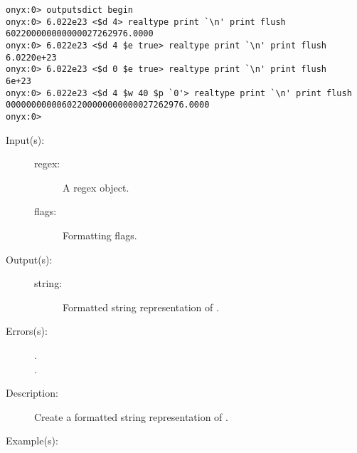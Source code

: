 \begin{description}
\begin{description}
\begin{verbatim}
onyx:0> outputsdict begin
onyx:0> 6.022e23 <$d 4> realtype print `\n' print flush
602200000000000027262976.0000
onyx:0> 6.022e23 <$d 4 $e true> realtype print `\n' print flush
6.0220e+23
onyx:0> 6.022e23 <$d 0 $e true> realtype print `\n' print flush
6e+23
onyx:0> 6.022e23 <$d 4 $w 40 $p `0'> realtype print `\n' print flush
00000000000602200000000000027262976.0000
onyx:0>
		\end{verbatim}
	\end{description}
\label{outputsdict:regextype}
\item[{\onyxop{regex flags}{regextype}{string}}: ]
	\begin{description}\item[]
	\item[Input(s): ]
		\begin{description}\item[]
		\item[regex: ]
			A regex object.
		\item[flags: ]
			Formatting flags.
		\end{description}
	\item[Output(s): ]
		\begin{description}\item[]
		\item[string: ]
			Formatted string representation of .
		\end{description}
	\item[Errors(s): ]
		\begin{description}\item[]
		\item[.]
		\item[.]
		\end{description}
	\item[Description: ]
		Create a formatted string representation of .
	\item[Example(s): ]\begin{verbatim}


\end{verbatim}
\end{description}
\end{description}
